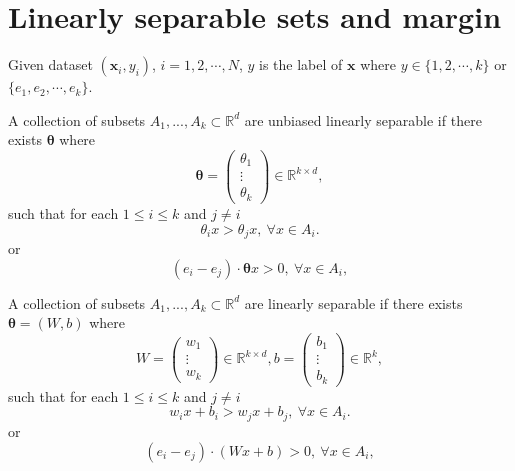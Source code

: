 
\section{Linearly separable sets and margin}
Given dataset $(\bm x_i, y_i)$, $i = 1,2,\cdots,N$, $y$ is the label of $\bm x$ where $y\in \{1,2,\cdots,k\}$ or $\{e_1,e_2,\cdots,e_k\}$.

\begin{definition}
	A collection of subsets $A_1,...,A_k\subset \mathbb{R}^d$ are unbiased
	linearly separable if there exists $\bm \theta$ where
	\begin{equation}
	\label{theta}
	\bm\theta=
	\begin{pmatrix}
	\theta_1\\
	\vdots\\
	\theta_k
	\end{pmatrix}
	\in \mathbb{R}^{k\times d}, 
	\end{equation}
	such that for each $1\le i\le k$ and $ j \neq i$
	\begin{equation}
	\label{eq:3}
	\theta_i x > \theta_j x,\ \forall x\in A_i.
	\end{equation}
	or
	\begin{equation}
	\label{eq:3}
	(e_i-e_j)\cdot\bm\theta x > 0,\ \forall x\in A_i,
	\end{equation}
\end{definition}

\begin{definition}
	A collection of subsets $A_1,...,A_k\subset \mathbb{R}^d$ are
	linearly separable if there exists $\bm \theta = (W,b)$ where
	\begin{equation}
	\label{Wb}
	W=
	\begin{pmatrix}
	w_1\\
	\vdots\\
	w_k
	\end{pmatrix}
	\in \mathbb{R}^{k\times d}, 
	b=
	\begin{pmatrix}
	b_1\\
	\vdots\\
	b_k
	\end{pmatrix}
	\in \mathbb{R}^{k}, 
	\end{equation}
	such that for each $1\le i\le k$ and $ j \neq i$
	\begin{equation}
	\label{eq:3}
	w_ix+b_i > w_jx+b_j,\ \forall x\in A_i.
	\end{equation}
	or
	\begin{equation}
	\label{eq:3}
	(e_i-e_j)\cdot(Wx+b) > 0,\ \forall x\in A_i,
	\end{equation}
	
\end{definition}

